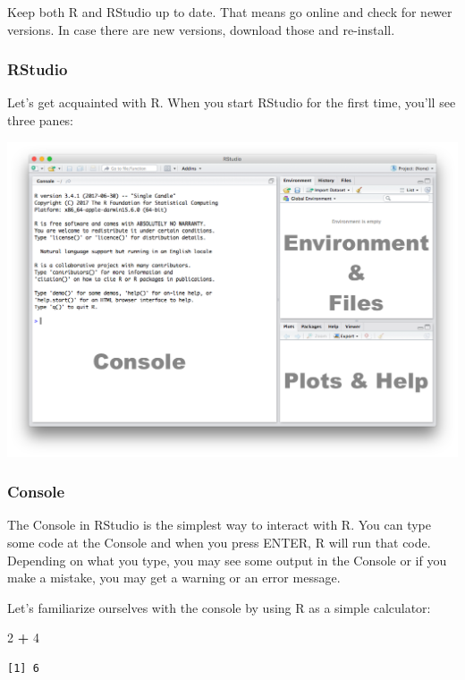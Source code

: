 \documentclass[]{article}
\newenvironment{Shaded}{\begin{snugshade}}{\end{snugshade}}
\newcommand{\DecValTok}[1]{\textcolor[rgb]{0.00,0.00,0.81}{#1}}
\newcommand{\OperatorTok}[1]{\textcolor[rgb]{0.81,0.36,0.00}{\textbf{#1}}}
\newcommand{\StringTok}[1]{\textcolor[rgb]{0.31,0.60,0.02}{#1}}
\begin{document}
Keep both R and RStudio up to date. That means go online and check for newer versions. In case there are new versions, download those and re-install.

\hypertarget{rstudio}{%
\subsubsection{RStudio}\label{rstudio}}

Let's get acquainted with R. When you start RStudio for the first time, you'll see three panes:

\includegraphics{./img/rstudio_default.png}

\hypertarget{console}{%
\subsubsection{Console}\label{console}}

The Console in RStudio is the simplest way to interact with R. You can type some code at the Console and when you press ENTER, R will run that code. Depending on what you type, you may see some output in the Console or if you make a mistake, you may get a warning or an error message.

Let's familiarize ourselves with the console by using R as a simple calculator:

\begin{Shaded}
\begin{Highlighting}[]
\DecValTok{2} \OperatorTok{+}\StringTok{ }\DecValTok{4}
\end{Highlighting}
\end{Shaded}

\begin{verbatim}
[1] 6
\end{verbatim}
\end{document}

